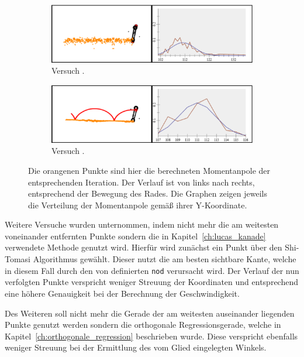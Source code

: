 \begin{figure}
    \centering
    \begin{subfigure}[t]{0.45\textwidth}
        \includegraphics[width=\textwidth]{gfx/drehendes_rad_1.png}
        \caption{Versuch .}\label{fig:drehendes_rad_1}
    \end{subfigure}
    \begin{subfigure}[t]{0.45\textwidth}
        \includegraphics[width=\textwidth]{gfx/drehendes_rad_4.png}
        \caption{Versuch .}\label{fig:drehendes_rad_4}
    \end{subfigure}
    \caption[Versuche  und ]{Die orangenen Punkte sind hier die berechneten Momentanpole der entsprechenden Iteration. Der Verlauf ist von links nach rechts, entsprechend der Bewegung des Rades. Die Graphen zeigen jeweils die Verteilung der Momentanpole gemä{\ss} ihrer Y-Koordinate.}
    \label{fig:drehendes_rad_1_4}
\end{figure}

Weitere Versuche wurden unternommen, indem nicht mehr die am weitesten voneinander entfernten Punkte sondern die in Kapitel~\ref{ch:lucas_kanade} verwendete Methode genutzt wird.
Hierfür wird zunächst ein Punkt über den Shi-Tomasi Algorithmus gewählt.
Dieser nutzt die am besten sichtbare Kante, welche in diesem Fall durch den von  definierten \lstinline{nod} verursacht wird.
Der Verlauf der nun verfolgten Punkte verspricht weniger Streuung der Koordinaten und entsprechend eine höhere Genauigkeit bei der Berechnung der Geschwindigkeit.

Des Weiteren soll nicht mehr die Gerade der am weitesten auseinander liegenden Punkte genutzt werden sondern die orthogonale Regressionsgerade, welche in Kapitel~\ref{ch:orthogonale_regression} beschrieben wurde.
Diese verspricht ebenfalls weniger Streuung bei der Ermittlung des vom Glied eingelegten Winkels.

